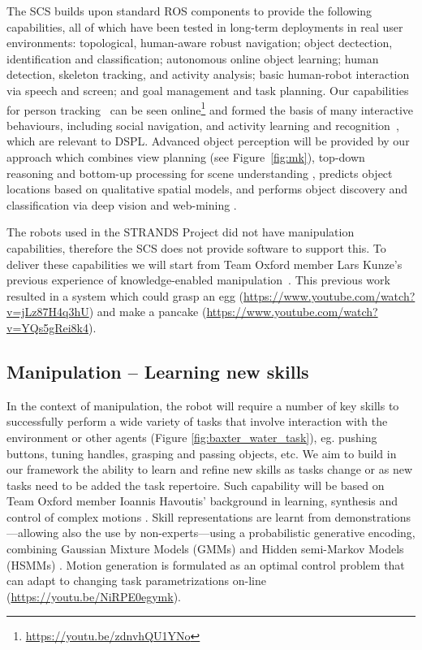 \documentclass[runningheads,a4paper]{llncs}
\newcommand{\teamori}{Team Oxford}
\begin{document}
The SCS builds upon standard ROS components to provide the following capabilities, all of which have been tested in long-term deployments in real user environments: topological, human-aware robust navigation; object dectection, identification and classification; autonomous online object learning; human detection, skeleton tracking, and activity analysis; basic human-robot interaction via speech and screen; and goal management and task planning. Our capabilities for person tracking~\cite{dondrup2015tracker} can be seen online\footnote{\url{https://youtu.be/zdnvhQU1YNo}} and formed the basis of many interactive behaviours, including social navigation, and activity learning and recognition~\cite{duckworth_aamas2016}, which are relevant to DSPL. Advanced object perception will be provided by our approach which combines view planning (see Figure~\ref{fig:mk}), top-down reasoning and bottom-up processing for scene understanding \cite{kunze14topdown}, predicts object locations based on qualitative spatial models\cite{kunze14bootstrapping}, and performs object discovery and classification via deep vision and web-mining \cite{aloof@icra17}.

The robots used in the STRANDS Project did not have manipulation capabilities, therefore the SCS does not provide software to support this. To deliver these capabilities we will start from \teamori{} member Lars Kunze's previous experience of knowledge-enabled manipulation~\cite{kunze15aij}. This previous work resulted in a system which could grasp an egg (\url{https://www.youtube.com/watch?v=jLz87H4q3hU}) and make a pancake (\url{https://www.youtube.com/watch?v=YQs5gRei8k4}).


\subsection{Manipulation -- Learning new skills}
In the context of manipulation, the robot will require a number of key skills 
to successfully perform a wide
variety of tasks that involve interaction with the environment or other
agents (Figure \ref{fig:baxter_water_task}), eg. pushing buttons, tuning handles, grasping and passing objects, etc. %
We aim to build in our framework the ability
to learn and refine new skills as tasks change or as new tasks need to be added
the task repertoire. Such capability will be based on \teamori{} 
member Ioannis Havoutis' background in learning, synthesis and control of 
complex motions \cite{havoutis13ijrr,Havoutis16SSRR}. Skill representations
are learnt from demonstrations---allowing also the use by non-experts---using a probabilistic generative encoding, combining Gaussian 
Mixture Models (GMMs) and Hidden semi-Markov Models (HSMMs)
\cite{Havoutis17ICRA}. Motion generation is formulated as an optimal control
problem that can adapt to changing task parametrizations on-line \cite{Zeestraten17IROS,Zeestraten2017-RAL} (\url{https://youtu.be/NiRPE0egymk}).
\end{document}
